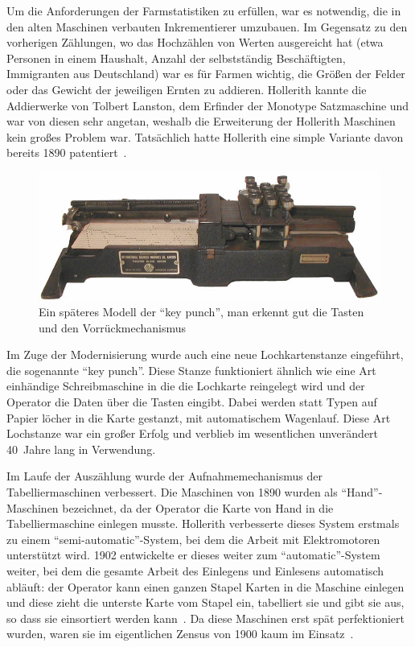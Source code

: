 \documentclass[parskip=half]{scrartcl}
\begin{document}
Um die Anforderungen der Farmstatistiken zu erfüllen, war es notwendig, die in
den alten Maschinen verbauten Inkrementierer umzubauen. Im
Gegensatz zu den vorherigen Zählungen, wo das Hochzählen von Werten ausgereicht
hat (etwa Personen in einem Haushalt, Anzahl der selbstständig Beschäftigten,
Immigranten aus Deutschland) war es für Farmen wichtig, die Größen der Felder
oder das Gewicht der jeweiligen Ernten zu addieren. Hollerith kannte die
Addierwerke von Tolbert Lanston, dem Erfinder der Monotype Satzmaschine und war
von diesen sehr angetan, weshalb die Erweiterung der Hollerith Maschinen kein
großes Problem war. Tatsächlich hatte Hollerith eine simple Variante davon bereits
1890 patentiert~\cite{truesdell1965development}.

\begin{figure}[h]
  \centering
  \includegraphics[width=\textwidth]{keypunch}
  \caption{Ein späteres Modell der \enquote{key punch}, man erkennt gut die
    Tasten und den Vorrückmechanismus~\cite{keypunch}}
  \label{fig:keypunch}
\end{figure}

Im Zuge der Modernisierung wurde auch eine neue Lochkartenstanze eingeführt,
die sogenannte \enquote{key punch}. Diese Stanze funktioniert ähnlich wie eine
Art einhändige Schreibmaschine in die die Lochkarte reingelegt wird und der
Operator die Daten über die Tasten eingibt. Dabei werden statt Typen auf Papier
löcher in die Karte gestanzt, mit automatischem Wagenlauf. Diese Art Lochstanze
war ein großer Erfolg und verblieb im wesentlichen unverändert 40~Jahre lang in
Verwendung.

Im Laufe der Auszählung wurde der Aufnahmemechanismus der Tabelliermaschinen
verbessert. Die Maschinen von 1890 wurden als \enquote{Hand}-Maschinen
bezeichnet, da der Operator die Karte von Hand in die Tabelliermaschine
einlegen musste. Hollerith verbesserte dieses System erstmals zu einem
\enquote{semi-automatic}-System, bei dem die Arbeit mit Elektromotoren
unterstützt wird. 1902 entwickelte er dieses weiter zum
\enquote{automatic}-System weiter, bei dem die gesamte Arbeit des Einlegens und
Einlesens automatisch abläuft: der Operator kann einen ganzen Stapel Karten in
die Maschine einlegen und diese zieht die unterste Karte vom Stapel ein,
tabelliert sie und gibt sie aus, so dass sie einsortiert werden
kann~\cite{austrian1982herman}. Da diese Maschinen erst spät perfektioniert
wurden, waren sie im eigentlichen Zensus von 1900 kaum im
Einsatz~\cite{truesdell1965development}.
\end{document}
